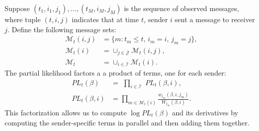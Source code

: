 \documentclass[aoas,preprint]{imsart}
\begin{document}
Suppose $(t_1, i_1, j_1), \ldots, (t_M, i_M, j_M)$ is the sequence of observed
messages, where tuple $(t,i,j)$ indicates that at time $t$, sender $i$ sent a
message to receiver $j$.  Define the following message sets:
\begin{align*}
  \mathcal{M}_t(i,j)
    &= \{ m : t_m \leq t, \, i_m = i, \, j_m = j \}, \\
  \mathcal{M}_t(i)
    &= \cup_{j \in \mathcal{J}} \mathcal{M}_t(i,j), \\
  \mathcal{M}_t
    &= \cup_{i \in \mathcal{I}} \mathcal{M}_t(i).
\end{align*}
The partial likelihood factors a a product of terms, one for each sender:
\begin{align*}
    \mathit{PL}_t(\beta)
        &=
        \,\,
        \prod_{i \in \mathcal{I}}
            \,\,
            \mathit{PL}_t(\beta, i), \\
    \mathit{PL}_t(\beta, i)
        &=
        \!\!\!\!
        \prod_{m \in \mathcal{M}_t(i)}
            \!\!\!
            \frac{w_{t_m} (\beta, i, j_m)}
                 {W_{t_m}(\beta, i)}.
\end{align*}
This factorization allows us to compute $\log \mathit{PL}_t(\beta)$ and
its derivatives by computing the sender-specific terms in parallel and
then adding them together.
\end{document}
